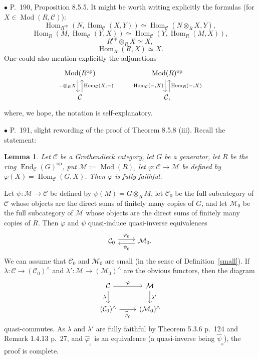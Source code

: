 \documentclass[12pt]{article}
\newtheorem{lem}[thm]{Lemma}
\theoremstyle{remark}%
\newcommand{\bu}{\bullet}
\newcommand{\n}{\noindent}
\newcommand{\C}{\mathcal C}
\newcommand{\M}{\mathcal M}
\newcommand{\p}{\varphi}
\newcommand{\pf}{\n{\em Proof. }}
\DeclareMathOperator{\Hom}{Hom}
\DeclareMathOperator{\h}{Hom}
\DeclareMathOperator{\Mod}{Mod}
\DeclareMathOperator{\op}{op}
\begin{document}

\n$\bu$ P.~190, Proposition 8.5.5. It might be worth writing explicitly the formulas (for $X\in\Mod(R,\C)$):
$$
\Hom_{R^{\op}}(N,\Hom_\C(X,Y))\simeq
\Hom_\C\left(N\otimes_RX,Y\right),
$$
$$
\Hom_R(M,\Hom_\C(Y,X))\simeq
\Hom_\C\left(Y,\Hom_R(M,X)\right),
$$
$$
R^{\op}\otimes_RX\simeq X,
$$
$$
\Hom_R(R,X)\simeq X.
$$
One could also mention explicitly the adjunctions
$$
\begin{tikzcd}
\Mod(R^{\op})\ar[xshift=-0.7ex]{d}[swap]{-\otimes_RX}&&&
\Mod(R)^{\op}\ar[xshift=-0.7ex]{d}[swap]{\Hom_\C(-,X)}\\
\C\ar[xshift=0.7ex]{u}[swap]{\Hom_\C(X,-)}&&&\C,\ar[xshift=0.7ex]{u}[swap]{\Hom_R(-,X)}
\end{tikzcd}
$$
where, we hope, the notation is self-explanatory. 


\n$\bu$ P.~191, slight rewording of the proof of Theorem 8.5.8 (iii). Recall the statement: 
%
\begin{lem}\label{858iii}
%
Let $\C$ be a Grothendieck category, let $G$ be a generator, let $R$ be the ring $\operatorname{End}_\C(G)^{\op}$, put $\M:=\Mod(R)$, let $\p:\C\to\M$ be defined by $\p(X)=\h_\C(G,X)$. Then $\p$ is fully faithful. 
%
\end{lem}
%
\pf Let $\psi:\M\to\C$ be defined by $\psi(M)=G\otimes_RM$, let $\C_0$ be the full subcategory of $\C$ whose objects are the direct sums of finitely many copies of $G$, and let $\M_0$ be the full subcategory of $\M$ whose objects are the direct sums of finitely many copies of $R$. Then $\p$ and $\psi$ quasi-induce quasi-inverse equivalences 
$$
\begin{tikzcd}
\C_0\ar[yshift=.7ex]{r}{\p_{{}_0}}&\M_0.\ar[yshift=-.7ex]{l}{\psi_{{}_0}}
\end{tikzcd}
$$ 
We can assume that $\C_0$ and $\M_0$ are small (in the sense of Definition~\ref{small}). If $\lambda:\C\to(\C_0)^\wedge$ and $\lambda':\M\to(\M_0)^\wedge$ are the obvious functors, then the diagram 
$$
\begin{tikzcd}
\C\ar{r}{\p}\ar{d}[swap]{\lambda}&\M\ar{d}{\lambda'}\\
(\C_0)^\wedge\ar{r}[swap]{\widehat\p_{{}_0}}&(\M_0)^\wedge
\end{tikzcd}
$$ 
quasi-commutes. As $\lambda$ and $\lambda'$ are fully faithful by Theorem 5.3.6 p.~124 and Remark 1.4.13 p.~27, and $\widehat\p_{{}_0}$ is an equivalence (a quasi-inverse being $\widehat\psi_{{}_0}$), the proof is complete. 
\end{document}
